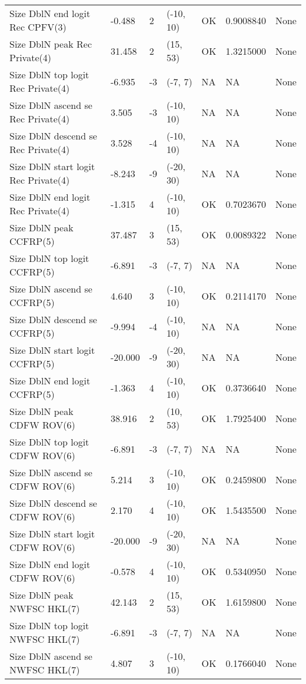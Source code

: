\documentclass[11pt,
  english,
  letterpaper,
]{article}
\begin{document}
\begin{landscape}
\begin{longtable}[t]{>{\raggedright\arraybackslash}p{7cm}lllll>{\raggedright\arraybackslash}p{4cm}}
Size DblN end logit Rec CPFV(3) & -0.488 & 2 & (-10, 10) & OK & 0.9008840 & None\\
Size DblN peak Rec Private(4) & 31.458 & 2 & (15, 53) & OK & 1.3215000 & None\\
Size DblN top logit Rec Private(4) & -6.935 & -3 & (-7, 7) & NA & NA & None\\
Size DblN ascend se Rec Private(4) & 3.505 & -3 & (-10, 10) & NA & NA & None\\
Size DblN descend se Rec Private(4) & 3.528 & -4 & (-10, 10) & NA & NA & None\\
Size DblN start logit Rec Private(4) & -8.243 & -9 & (-20, 30) & NA & NA & None\\
Size DblN end logit Rec Private(4) & -1.315 & 4 & (-10, 10) & OK & 0.7023670 & None\\
Size DblN peak CCFRP(5) & 37.487 & 3 & (15, 53) & OK & 0.0089322 & None\\
Size DblN top logit CCFRP(5) & -6.891 & -3 & (-7, 7) & NA & NA & None\\
Size DblN ascend se CCFRP(5) & 4.640 & 3 & (-10, 10) & OK & 0.2114170 & None\\
Size DblN descend se CCFRP(5) & -9.994 & -4 & (-10, 10) & NA & NA & None\\
Size DblN start logit CCFRP(5) & -20.000 & -9 & (-20, 30) & NA & NA & None\\
Size DblN end logit CCFRP(5) & -1.363 & 4 & (-10, 10) & OK & 0.3736640 & None\\
Size DblN peak CDFW ROV(6) & 38.916 & 2 & (10, 53) & OK & 1.7925400 & None\\
Size DblN top logit CDFW ROV(6) & -6.891 & -3 & (-7, 7) & NA & NA & None\\
Size DblN ascend se CDFW ROV(6) & 5.214 & 3 & (-10, 10) & OK & 0.2459800 & None\\
Size DblN descend se CDFW ROV(6) & 2.170 & 4 & (-10, 10) & OK & 1.5435500 & None\\
Size DblN start logit CDFW ROV(6) & -20.000 & -9 & (-20, 30) & NA & NA & None\\
Size DblN end logit CDFW ROV(6) & -0.578 & 4 & (-10, 10) & OK & 0.5340950 & None\\
Size DblN peak NWFSC HKL(7) & 42.143 & 2 & (15, 53) & OK & 1.6159800 & None\\
Size DblN top logit NWFSC HKL(7) & -6.891 & -3 & (-7, 7) & NA & NA & None\\
Size DblN ascend se NWFSC HKL(7) & 4.807 & 3 & (-10, 10) & OK & 0.1766040 & None\\

\end{longtable}
\end{landscape}
\end{document}
